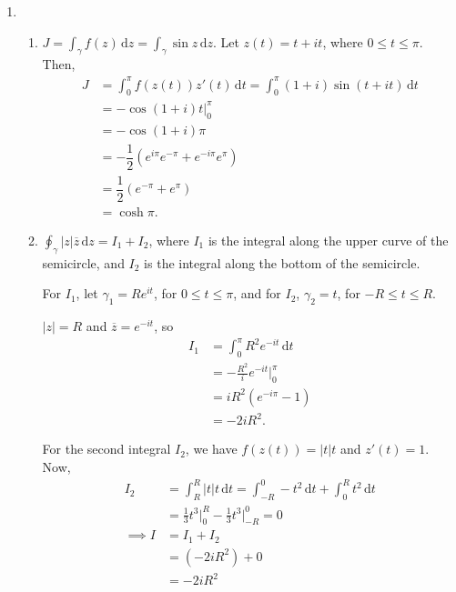 \documentclass{article}
\begin{document}
\begin{enumerate}
\begin{enumerate}
\end{enumerate}
\item
\begin{enumerate}

\item $J = \int_{\gamma} f(z) \,\text{d}z = \int_{\gamma} \sin z \,\text{d}z$. Let $z(t) = t + it$, where $0 \leq t \leq \pi$. Then,
\begin{align*}
J &= \int_0^\pi f(z(t))z'(t)\,\text{d}t = \int_0^\pi (1 + i)\sin(t + it) \,\text{d}t \\
&= -\cos(1 + i)t \Big|_0^\pi \\
&= -\cos(1+i)\pi \\
&= -\dfrac{1}{2}(e^{i\pi}e^{-\pi} + e^{-i\pi} e^{\pi})\\
&= \dfrac{1}{2} (e^{-\pi} + e^{\pi}) \\ 
&= \cosh \pi.
\end{align*}

\item
$\oint_\gamma |z|\overline{z}\,\text{d}z = I_1 + I_2 $, where $I_1$ is the integral along the upper curve of the semicircle, and $I_2$ is the integral along the bottom of the semicircle. 

For $I_1$, let $\gamma_1 = Re^{it}$, for $0 \leq t \leq \pi$, and for $I_2$, $\gamma_2 = t$, for $-R \leq t \leq R$.

$|z| = R$ and $\overline{z} = e^{-it}$, so
\begin{align*}
	I_1 &= \int_0^\pi R^2 e^{-it}\, \text{d}t \\
		&= -\frac{R^2}{i} e^{-it} \Big|_0^\pi \\
		&= iR^2( e^{-i\pi} - 1) \\
		&= -2iR^2.
\end{align*}

For the second integral $I_2$, we have $f(z(t)) = |t|t$ and $z'(t) = 1$. Now,
\begin{align*}
	I_2 &= \int_R^R |t|t \,\text{d}t 
		= \int_{-R}^0 -t^2 \,\text{d}t 
		+ \int_0^R t^2 \,\text{d}t \\
		&= \frac{1}{3}t^3 \Big|_0^R
		- \frac{1}{3} t^3 \Big|_{-R}^0 = 0 \\ \implies 
	I	&= I_1 + I_2 \\ &= (-2iR^2) + 0 \\ &= -2iR^2
\end{align*}
\end{enumerate}


\end{enumerate}
\end{document}
